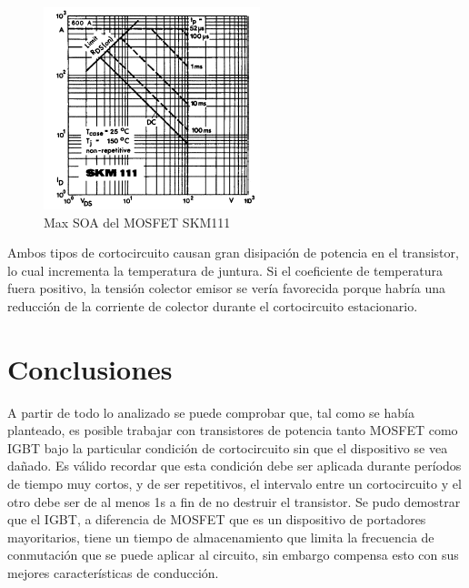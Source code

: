 \documentclass[conference]{IEEEtran}
\begin{document}
\begin{figure}[H]
	\centering
	\includegraphics[width=\columnwidth]{imagenes/SOA}
	\caption{Max SOA del MOSFET SKM111}
	\label{fig:SOA}
\end{figure}

Ambos tipos de cortocircuito causan gran disipación de potencia en el transistor, lo cual incrementa la temperatura de juntura. Si el coeficiente de temperatura fuera positivo, la tensión colector emisor se vería favorecida porque habría una reducción de la corriente de colector durante el cortocircuito estacionario.

\section{Conclusiones}
A partir de todo lo analizado se puede comprobar que, tal como se había planteado, es posible trabajar con transistores de potencia tanto MOSFET como IGBT bajo la particular condición de cortocircuito sin que el dispositivo se vea dañado. Es válido recordar que esta condición debe ser aplicada durante períodos de tiempo muy cortos, y de ser repetitivos, el intervalo entre un cortocircuito y el otro debe ser de al menos 1s a fin de no destruir el transistor. Se pudo demostrar que el IGBT, a diferencia de MOSFET que es un dispositivo de portadores mayoritarios, tiene un tiempo de almacenamiento que limita la frecuencia de conmutación que se puede aplicar al circuito, sin embargo compensa esto con sus mejores características de conducción.
\end{document}

